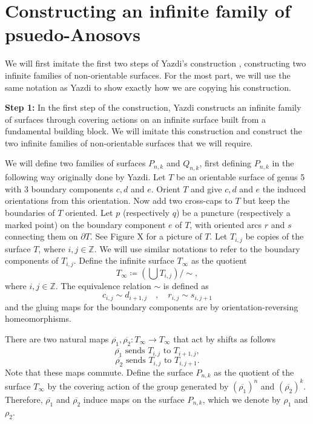 \section{Constructing an infinite family of psuedo-Anosovs}
\label{sec:constr-an-infin}

We will first imitate the first two steps of Yazdi's construction \cite{yazdi2018pseudo}, constructing two infinite families of non-orientable surfaces. For the most part, we will use the same notation as Yazdi to show exactly how we are copying his construction.

\textbf{Step 1:} In the first step of the construction, Yazdi constructs an infinite family of surfaces through covering actions on an infinite surface built from a fundamental building block. We will imitate this construction and construct the two infinite families of non-orientable surfaces that we will require. 

We will define two families of surfaces $P_{n,k}$ and $Q_{n,k}$, first defining $P_{n,k}$ in the following way originally done by Yazdi. Let $T$ be an orientable surface of genus 5 with 3 boundary components $c,d$ and $e$. Orient $T$ and give $c,d$ and $e$ the induced orientations from this orientation. Now add two cross-caps to $T$ but keep the boundaries of $T$ oriented. Let $p$ (respectively $q$) be a puncture (respectively a marked point) on the boundary component $e$ of $T$, with oriented arcs $r$ and $s$ connecting them on $\partial T$. See Figure X for a picture of $T$. Let $T_{i,j}$ be copies of the surface $T$, where $i,j \in \mathbb{Z}$. We will use similar notations to refer to the boundary components of $T_{i,j}$. Define the infinite surface $T_\infty$ as the quotient
$$T_\infty \coloneqq \left( \bigcup T_{i,j} \right)/\sim,$$
where $i,j \in \mathbb{Z}$. The equivalence relation $\sim$ is defined as $$c_{i,j} \sim d_{i+1,j} \hspace{1em}, \hspace{1em} r_{i,j} \sim s_{i,j+1}$$ and the gluing maps for the boundary components are by orientation-reversing homeomorphisms.

There are two natural maps $\overline{\rho_1},\overline{\rho_2}: T_\infty \xrightarrow[]{} T_\infty$ that act by shifts as follows $$\overline{\rho_1} \text{ sends } T_{i,j} \text{ to } T_{i+1,j},$$ $$\overline{\rho_2} \text{ sends } T_{i,j} \text{ to } T_{i,j+1}.$$ Note that these maps commute. Define the surface $P_{n,k}$ as the quotient of the surface $T_\infty$ by the covering action of the group generated by $(\overline{\rho_1})^n$ and $(\overline{\rho_2})^k$. Therefore, $\overline{\rho_1}$ and $\overline{\rho_2}$ induce maps on the surface $P_{n,k}$, which we denote by $\rho_1$ and $\rho_2$.

